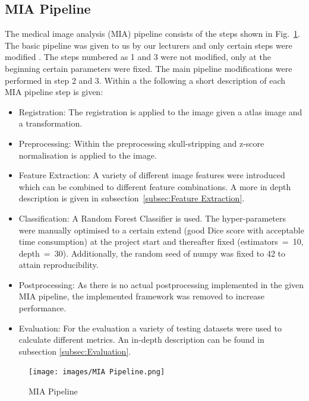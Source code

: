 \documentclass[conference]{IEEEtran}
\begin{document}
\subsection{MIA Pipeline} \label{subsec:MIA Pipeline}
The medical image analysis (MIA) pipeline consists of the steps shown in Fig.~\ref{fig:MIA pipeline}. The basic pipeline was given to us by our lecturers and only certain steps were modified \cite{b1}. The steps numbered as 1 and 3 were not modified, only at the beginning certain parameters were fixed. The main pipeline modifications were performed in step 2 and 3. Within a the following a short description of each MIA pipeline step is given:

\begin{itemize}
    \item Registration: The registration is applied to the image given a atlas image and a transformation.
    \item Preprocessing: Within the preprocessing skull-stripping and z-score normalisation is applied to the image.
    \item Feature Extraction: A variety of different image features were introduced which can be combined to different feature combinations. A more in depth description is given in subsection~\ref{subsec:Feature Extraction}.
    \item Classification: A Random Forest Classifier is used. The hyper-parameters were manually optimised to a certain extend (good Dice score with acceptable time consumption) at the project start and thereafter fixed (estimators~=~10, depth~=~30). Additionally, the random seed of numpy was fixed to 42 to attain reproducibility.
    \item Postprocessing: As there is no actual postprocessing implemented in the given MIA pipeline, the implemented framework was removed to increase performance.
    \item Evaluation: For the evaluation a variety of testing datasets were used to calculate different metrics. An in-depth description can be found in subsection \ref{subsec:Evaluation}.
\end{itemize}

\begin{figure}[h!]
  \centering
  \texttt{[image: images/MIA Pipeline.png]}
  \caption{MIA Pipeline}
  \label{fig:MIA pipeline}
\end{figure}
\newpage
\end{document}

